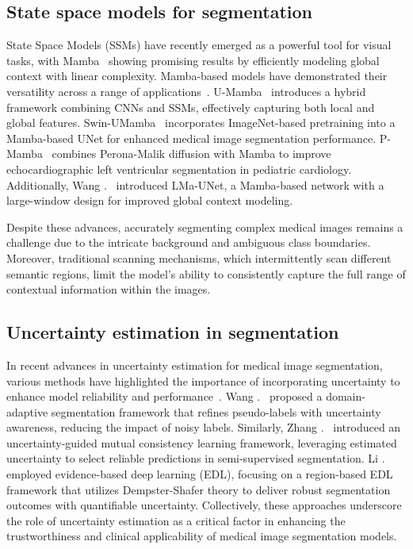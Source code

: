 \subsection{State space models for segmentation}
State Space Models (SSMs) have recently emerged as a powerful tool for visual tasks, with Mamba~\cite{gu2023mamba,dao2024transformers} showing promising results by efficiently modeling global context with linear complexity. Mamba-based models have demonstrated their versatility across a range of applications~\cite{zhu2024vision,ruan2024vm,he2024mambaad,zhang2024voxel,fan2024slicemamba}. U-Mamba~\cite{ma2024u} introduces a hybrid framework combining CNNs and SSMs, effectively capturing both local and global features. Swin-UMamba~\cite{liu2024swin} incorporates ImageNet-based pretraining into a Mamba-based UNet for enhanced medical image segmentation performance.
P-Mamba~\cite{ye2024p} combines Perona-Malik diffusion with Mamba to improve echocardiographic left ventricular segmentation in pediatric cardiology. Additionally, Wang \etal.~\cite{wang2024large} introduced LMa-UNet, a Mamba-based network with a large-window design for improved global context modeling.


Despite these advances, accurately segmenting complex medical images remains a challenge due to the intricate background and ambiguous class boundaries. Moreover, traditional scanning mechanisms, which intermittently scan different semantic regions, limit the model's ability to consistently capture the full range of contextual information within the images.

\subsection{Uncertainty estimation in segmentation}
In recent advances in uncertainty estimation for medical image segmentation, various methods have highlighted the importance of incorporating uncertainty to enhance model reliability and performance~\cite{lu2023uncertainty,wei2023consistency,monteiro2020stochastic,wang2019aleatoric,zheng2021rectifying,fan2022ucc}. Wang \etal.~\cite{9710267} proposed a domain-adaptive segmentation framework that refines pseudo-labels with uncertainty awareness, reducing the impact of noisy labels. Similarly, Zhang \etal.~\cite{zhang2023uncertainty} introduced an uncertainty-guided mutual consistency learning framework, leveraging estimated uncertainty to select reliable predictions in semi-supervised segmentation. Li \etal.~\cite{li2023region} employed evidence-based deep learning (EDL), focusing on a region-based EDL framework that utilizes Dempster-Shafer theory to deliver robust segmentation outcomes with quantifiable uncertainty. Collectively, these approaches underscore the role of uncertainty estimation as a critical factor in enhancing the trustworthiness and clinical applicability of medical image segmentation models.

\label{sec:related}